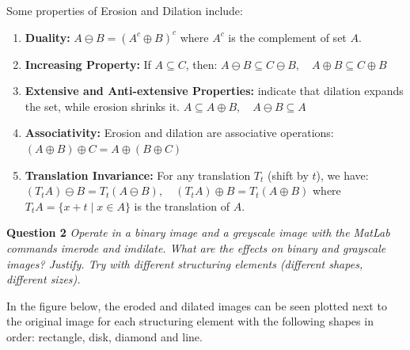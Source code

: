 Some properties of Erosion and Dilation include:
\begin{enumerate}
    \item \textbf{Duality:} 
    $A \ominus B = (A^c \oplus B)^c$ where \( A^c \) is the complement of set \( A \).

    \item \textbf{Increasing Property:} If \( A \subseteq C \), then: 
    $A \ominus B \subseteq C \ominus B, \quad A \oplus B \subseteq C \oplus B$

    \item \textbf{Extensive and Anti-extensive Properties:} indicate that dilation expands the set, while erosion shrinks it.
    $A \subseteq A \oplus B, \quad A \ominus B \subseteq A$ 

    \item \textbf{Associativity:} Erosion and dilation are associative operations: 
    $(A \oplus B) \oplus C = A \oplus (B \oplus C)$

    \item \textbf{Translation Invariance:} For any translation \( T_t \) (shift by \( t \)), we have: 
    $(T_t A) \ominus B = T_t (A \ominus B), \quad (T_t A) \oplus B = T_t (A \oplus B)$ where \( T_t A = \{ x + t \mid x \in A \} \) is the translation of \( A \).
\end{enumerate}


\newpage
\textbf{Question 2} \textit{Operate in a binary image and a greyscale image with the MatLab commands imerode and imdilate. What are the eﬀects on binary and grayscale images? Justify. Try with diﬀerent structuring elements (diﬀerent shapes, diﬀerent sizes).}

In the figure below, the eroded and dilated images can be seen plotted next to the original image for each structuring element with the following shapes in order: rectangle, disk, diamond and line. 

\vfill

